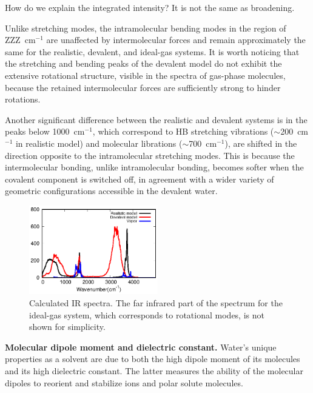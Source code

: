 \documentclass[aps,prl,reprint,amsmath,amssymb]{revtex4-1}
\begin{document}

\new 
How do we explain the integrated intensity? It is not the same as broadening.
\old 

Unlike stretching modes, the intramolecular bending modes in the region of ZZZ~cm$^{-1}$ are unaffected by intermolecular forces and remain approximately the same for the realistic, devalent, and ideal-gas systems. 
It is worth noticing that the stretching and bending peaks of the devalent model do not exhibit the extensive rotational structure, visible in the spectra of gas-phase molecules, because the retained intermolecular forces are sufficiently strong to hinder rotations.

Another significant difference between the realistic and devalent systems is in the peaks below 1000~cm$^{-1}$, which correspond to HB stretching vibrations ($\sim$200~cm$^{-1}$ in realistic model) and molecular librations ($\sim$700~cm$^{-1}$), are shifted in the direction opposite to the intramolecular stretching modes. This is because the intermolecular bonding, unlike intramolecular bonding, becomes softer when the covalent component is switched off, in agreement with a wider variety of geometric configurations accessible in the devalent water. 

\begin{figure}
\centering
\includegraphics[width=0.5\textwidth]{new_ir}
\caption{Calculated IR spectra. The far infrared part of the spectrum for the ideal-gas system, which corresponds to rotational modes, is not shown for simplicity. 
} \label{Fig:IR}
\end{figure}

\textbf{Molecular dipole moment and dielectric constant.} Water's unique properties as a solvent are due to both the high dipole moment of its molecules and its high dielectric constant. 
The latter measures the ability of the molecular dipoles to reorient and stabilize ions and polar solute molecules. 
\end{document}
